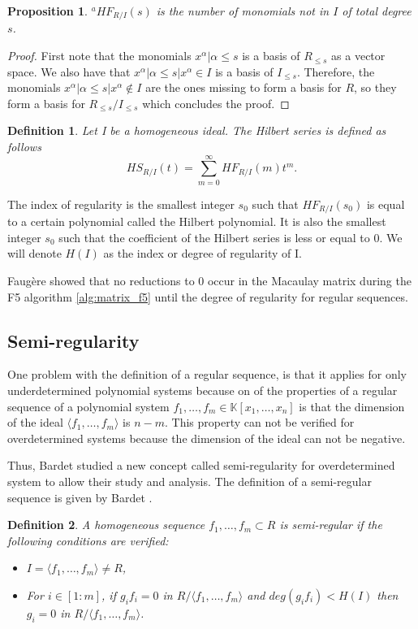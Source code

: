 \documentclass[english]{article}
\newtheorem{proposition}{Proposition}[section]
\newtheorem{definition}{Definition}[section]
\begin{document}
		\begin{proposition}
			${}^a HF_{R/I}(s)$ is the number of monomials not in $I$ of total degree $s$.
		\end{proposition}
		\begin{proof}
			First note that the monomials ${x^\alpha | \alpha \leq s}$ is a basis of $R_{\leq s}$ as a vector space. We also have that ${x^\alpha | \alpha \leq s | x^\alpha \in I}$ is a basis of $I_{\leq s}$. Therefore, the monomials ${x^\alpha | \alpha \leq s | x^\alpha \notin I}$ are the ones missing to form a basis for $R$, so they form a basis for $R_{\leq s} / I_{\leq s}$ which concludes the proof.
		\end{proof}
		
		\begin{definition}
			Let I be a homogeneous ideal. The Hilbert series is defined as follows
			$$
					HS_{R/I}(t) = \sum_{m=0}^{\infty} HF_{R/I}(m) t^m.
			$$	
		\end{definition}
		
		The index of regularity is the smallest integer $s_0$ such that $HF_{R/I}(s_0)$ is equal to a certain polynomial called the Hilbert polynomial. It is also the smallest integer $s_0$ such that the coefficient of the Hilbert series is less or equal to 0. We will denote $H(I)$ as the index or degree of regularity of I.
		
		Faugère showed that no reductions to 0 occur in the Macaulay matrix during the F5 algorithm \ref{alg:matrix_f5} until the degree of regularity \cite{F02} for regular sequences.
		
		\subsection{Semi-regularity}
		One problem with the definition of a regular sequence, is that it applies for only underdetermined  polynomial systems because on of the properties of a regular sequence of a polynomial system $f_1,\dots,f_m \in \mathbb{K}[x_1,\dots,x_n]$ is that the dimension of the ideal $\langle f_1,\dots,f_m \rangle$ is $n - m$. This property can not be verified for overdetermined systems because the dimension of the ideal can not be negative.
		
		Thus, Bardet studied a new concept called semi-regularity for overdetermined system to allow their study and analysis. The definition of a semi-regular sequence is given by Bardet \cite{Bardet04}.
		
		\begin{definition}
			A homogeneous sequence $f_1,\dots,f_m \subset R$ is semi-regular if the following conditions are verified:
			\begin{itemize}
				\item $I = \langle f_1,\dots,f_m \rangle \neq R$,
				\item For $i \in [1:m]$, if $g_if_i = 0$ in $R/\langle f_1,\dots,f_m \rangle$ and $deg(g_if_i) < H(I)$ then $g_i = 0$ in $R/\langle f_1,\dots,f_m \rangle$.
			\end{itemize} 
		\end{definition}
		
\end{document}
